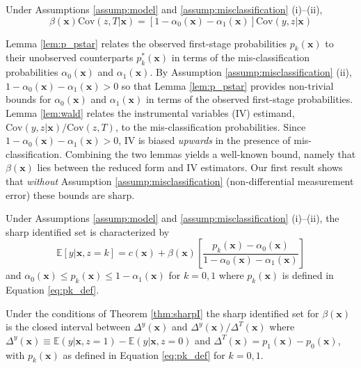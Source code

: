 \begin{lem}
  \label{lem:wald}
  Under Assumptions \ref{assump:model} and \ref{assump:misclassification} (i)--(ii), $$\beta(\mathbf{x}) \mbox{Cov}(z,T|\mathbf{x}) = \left[ 1 - \alpha_0(\mathbf{x}) - \alpha_1(\mathbf{x}) \right]\mbox{Cov}(y,z|\mathbf{x})$$
\end{lem}

Lemma \ref{lem:p_pstar} relates the observed first-stage probabilities $p_k(\mathbf{x})$ to their unobserved counterparts $p^*_k(\mathbf{x})$ in terms of the mis-classification probabilities $\alpha_0(\mathbf{x})$ and $\alpha_1(\mathbf{x})$.
By Assumption \ref{assump:misclassification} (ii), $1 - \alpha_0(\mathbf{x}) - \alpha_1(\mathbf{x}) > 0$ so that Lemma \ref{lem:p_pstar} provides non-trivial bounds for $\alpha_0(\mathbf{x})$ and $\alpha_1(\mathbf{x})$ in terms of the observed first-stage probabilities.
Lemma \ref{lem:wald} relates the instrumental variables (IV) estimand, $\mbox{Cov}(y,z|\mathbf{x})/\mbox{Cov}(z,T)$, to the mis-classification probabilities.
Since $1 - \alpha_0(\mathbf{x}) - \alpha_1(\mathbf{x}) > 0$, IV is biased \emph{upwards} in the presence of mis-classification.
Combining the two lemmas yields a well-known bound, namely that $\beta(\mathbf{x})$ lies between the reduced form and IV estimators.
Our first result shows that \emph{without} Assumption \ref{assump:misclassification} (non-differential measurement error) these bounds are sharp.

\begin{thm}
  Under Assumptions \ref{assump:model} and \ref{assump:misclassification} (i)--(ii), the sharp identified set is characterized by 
  \begin{equation}
    \mathbb{E}[y|\mathbf{x},z=k] = c(\mathbf{x}) + \beta(\mathbf{x}) \left[\frac{p_k(\mathbf{x}) - \alpha_0(\mathbf{x})}{1 - \alpha_0(\mathbf{x}) - \alpha_1(\mathbf{x})}\right]
    \label{eq:identsetI}
  \end{equation}
and $\alpha_0(\mathbf{x}) \leq p_k(\mathbf{x}) \leq 1 -  \alpha_1(\mathbf{x})$ for  $k = 0, 1$ where $p_k(\mathbf{x})$ is defined in Equation \ref{eq:pk_def}.
  \label{thm:sharpI}
\end{thm}

\begin{cor}
  Under the conditions of Theorem \ref{thm:sharpI} the sharp identified set for $\beta(\mathbf{x})$ is the closed interval between $\Delta^y(\mathbf{x})$ and $\Delta^y(\mathbf{x})/\Delta^T(\mathbf{x})$ 
  where $\Delta^y(\mathbf{x}) \equiv \mathbb{E}(y|\mathbf{x},z=1) - \mathbb{E}(y|\mathbf{x},z=0)$ and $\Delta^T(\mathbf{x})= p_1(\mathbf{x}) - p_0(\mathbf{x})$, with $p_k(\mathbf{x})$ as defined in Equation \ref{eq:pk_def} for $k = 0,1$. 
\label{cor:sharpBeta1}
\end{cor}

